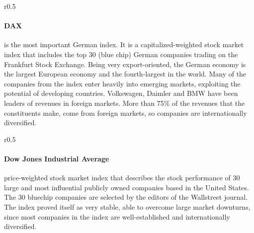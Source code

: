 \documentclass{scrreprt}
\begin{document}
\begin{wrapfigure}{r}{0.5\textwidth}
  \centering
\end{wrapfigure}
%
\paragraph{DAX} is the most important German index.
It is a capitalized-weighted stock market index that includes the top 30 (blue chip) German companies trading on the Frankfurt Stock Exchange.
Being very export-oriented, the German economy is the largest European economy and the fourth-largest in the world.
Many of the companies from the index enter heavily into emerging markets, exploiting the potential of developing countries.
Volkswagen, Daimler and BMW have been leaders of revenues in foreign markets.
More than 75\% of the revenues that the constituents make, come from foreign markets, so companies are internationally diversified.


\begin{wrapfigure}{r}{0.5\textwidth}
  \centering
\end{wrapfigure}
%
\paragraph{Dow Jones Industrial Average} price-weighted stock market index that describes the stock performance of 30 large and most influential publicly owned companies based in the United States.
The 30 bluechip companies are selected by the editors of the Wallstreet journal.
The index proved itself as very stable, able to overcome large market downturns, since most companies in the index are well-established and internationally diversified.
\end{document}
